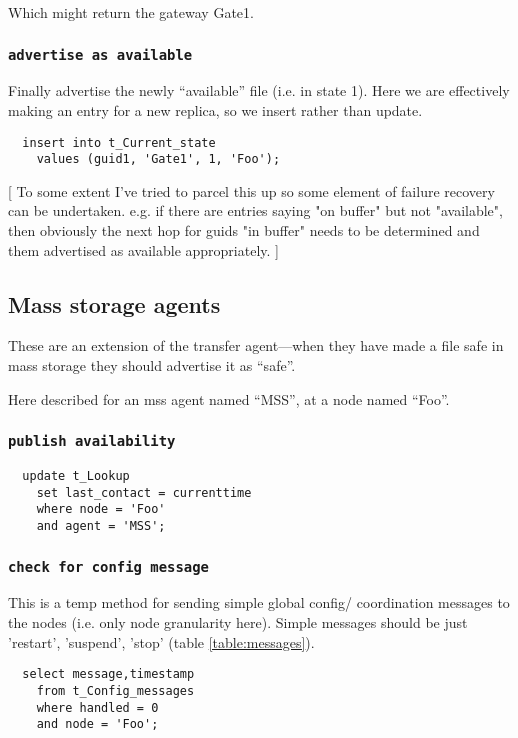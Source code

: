 \documentclass{cmspaper}
\begin{document}
Which might return the gateway Gate1. 

\subsubsection{\textbf{\texttt{advertise as available}}}
Finally advertise the newly ``available'' file (i.e. in state 1). Here we are effectively making an entry for a new replica, so we insert rather than update.

{\small\begin{verbatim}
  insert into t_Current_state
    values (guid1, 'Gate1', 1, 'Foo');
\end{verbatim}}

[ To some extent I've tried to parcel this up so some element of failure recovery can be undertaken. e.g. if there are entries saying "on buffer" but not "available", then obviously the next hop for guids "in buffer" needs to be determined and them advertised as available appropriately. ]

\subsection{Mass storage agents}
These are an extension of the transfer agent---when they have made a
file safe in mass storage they should advertise it as ``safe''.

Here described for an mss agent named ``MSS'', at a node named ``Foo''.

\subsubsection{\textbf{\texttt{publish availability}}}

{\small\begin{verbatim}
  update t_Lookup
    set last_contact = currenttime
    where node = 'Foo'
    and agent = 'MSS';
\end{verbatim}}

\subsubsection{\textbf{\texttt{check for config message}}}
This is a temp method for sending simple global config/ coordination messages to the nodes (i.e. only node granularity here). Simple messages should be just 'restart', 'suspend', 'stop' (table \ref{table:messages}).

{\small\begin{verbatim}
  select message,timestamp
  	from t_Config_messages
  	where handled = 0
  	and node = 'Foo';
\end{verbatim}}
\end{document}
